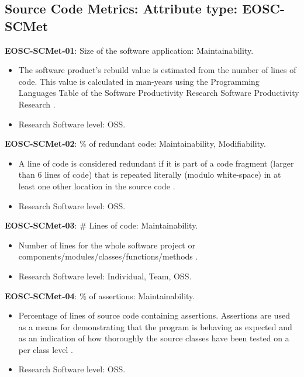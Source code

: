 \subsection{Source Code Metrics: Attribute type: EOSC-SCMet}

\textbf{EOSC-SCMet-01}: Size of the software application: Maintainability.

\begin{itemize}
    \item The software product's rebuild value is estimated from the number of lines of code. This value is calculated in man-years using the  Programming Languages Table of the Software Productivity Research Software Productivity Research \cite{baggen_standardized_2012}.
    \item Research Software level: OSS.
\end{itemize}

\textbf{EOSC-SCMet-02}: \% of redundant code: Maintainability, Modifiability.

\begin{itemize}
    \item A line of code is considered redundant if it is part of a code fragment (larger than 6 lines of code) that is repeated literally (modulo  white-space) in at least one other location in the source code \cite{baggen_standardized_2012}.
    \item Research Software level: OSS.
\end{itemize}

\textbf{EOSC-SCMet-03}: \# Lines of code: Maintainability.

\begin{itemize}
    \item Number of lines for the whole software project or components/modules/classes/functions/methods \cite{montagud_systematic_2012,baggen_standardized_2012}.
    \item Research Software level: Individual, Team, OSS.
\end{itemize}

\textbf{EOSC-SCMet-04}: \% of assertions: Maintainability.

\begin{itemize}
    \item Percentage of lines of source code containing assertions. Assertions are used as a means for demonstrating that the program is behaving as expected and as an indication of how thoroughly the source classes have been tested on a per class level \cite{nagappan_early_2005}.
    \item Research Software level: OSS.
\end{itemize}

